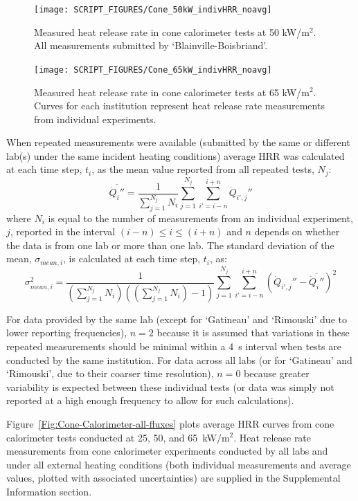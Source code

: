 \documentclass{book}
\begin{document}
\begin{figure}
  \centering
  \texttt{[image: SCRIPT\_FIGURES/Cone\_50kW\_indivHRR\_noavg]}
  \caption{Measured heat release rate in cone calorimeter tests at 50 kW/m$^2$. All measurements submitted by ‘Blainville-Boisbriand’.}
  \label{Fig:Cone_50kWindivHRR}
\end{figure}

\begin{figure}
  \centering
  \texttt{[image: SCRIPT\_FIGURES/Cone\_65kW\_indivHRR\_noavg]}
  \caption{Measured heat release rate in cone calorimeter tests at 65 kW/m$^2$. Curves for each institution represent heat release rate measurements from individual experiments.}
  \label{Fig:Cone_65kWindivHRR}
\end{figure}

When repeated measurements were available (submitted by the same or different lab(s) under the same incident heating conditions) average HRR was calculated at each time step, $t_i$, as the mean value reported from all repeated tests, $N_j$:
\begin{equation}
  \overline{\dot{Q}_i''} = \frac{1}{\sum_{j=1}^{N_j}N_i} \sum_{j=1}^{N_j} \sum_{i'=i-n}^{i+n} \dot{Q}_{i',j}''
\end{equation}
where $N_i$ is equal to the number of measurements from an individual experiment, $j$, reported in the interval $(i-n) \leq i \leq (i+n)$ and $n$ depends on whether the data is from one lab or more than one lab. The standard deviation of the mean, $\sigma_{mean,i}$, is calculated at each time step, $t_i$, as:
\begin{equation}
   \sigma_{mean,i}^2 = \frac{1}{(\sum_{j=1}^{N_j}N_i)((\sum_{j=1}^{N_j}N_i)-1)}   \sum_{j=1}^{N_j} \sum_{i'=i-n}^{i+n} \left( \dot{Q}_{i',j}'' - \overline{\dot{Q}_i''} \right)^2
\end{equation}

For data provided by the same lab (except for ‘Gatineau’ and ‘Rimouski’ due to lower reporting frequencies), $n=2$ because it is assumed that variations in these repeated measurements should be minimal within a 4~s interval when tests are conducted by the same institution. For data across all labs (or for ‘Gatineau’ and ‘Rimouski’, due to their coarser time resolution), $n=0$ because greater variability is expected between these individual tests (or data was simply not reported at a high enough frequency to allow for such calculations).


Figure~\ref{Fig:Cone-Calorimeter-all-fluxes} plots average HRR curves from cone calorimeter tests conducted at 25, 50, and 65~kW/m$^2$. Heat release rate measurements from cone calorimeter experiments conducted by all labs and under all external heating conditions (both individual measurements and average values, plotted with associated uncertainties) are supplied in the Supplemental Information section.
\end{document}
